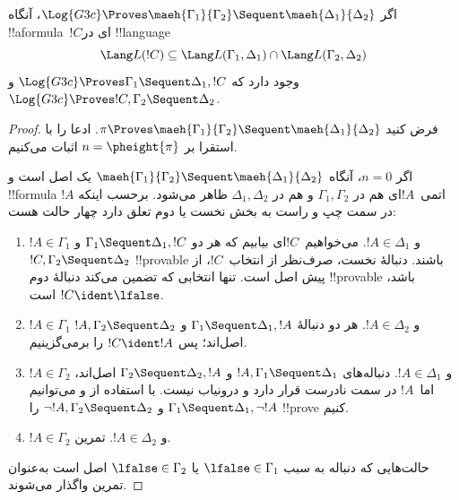 \documentclass[../../../include/open-logic-section]{subfiles}
\begin{document}
\begin{lem}[لم مائهارا]
اگر
$\Log{G3c}\Proves\maeh{\Gamma_1}{\Gamma_2}\Sequent
\maeh{\Delta_1}{\Delta_2}$، آنگاه !!a{formula}~$!C$ای در
!!{language}
\[
\Lang L(!C)\subseteq
\Lang L(\Gamma_1,\Delta_1)\cap\Lang L(\Gamma_2,\Delta_2)
\]
وجود دارد که
$\Log{G3c}\Proves\Gamma_1\Sequent\Delta_1,!C$ و
$\Log{G3c}\Proves !C,\Gamma_2\Sequent\Delta_2$.
\end{lem}

\begin{proof}
فرض کنید
$\pi\Proves\maeh{\Gamma_1}{\Gamma_2}\Sequent
\maeh{\Delta_1}{\Delta_2}$. ادعا را با استقرا بر
$n=\pheight{\pi}$ اثبات می‌کنیم.

اگر $n=0$، آنگاه
$\maeh{\Gamma_1}{\Gamma_2}\Sequent
\maeh{\Delta_1}{\Delta_2}$ یک اصل است و !!{formula} اتمی~$!A$ای هم
در $\Gamma_1,\Gamma_2$ و هم در $\Delta_1,\Delta_2$ ظاهر می‌شود. برحسب
اینکه $!A$ در سمت چپ و راست به بخش نخست یا دوم تعلق دارد چهار حالت
هست:
\begin{enumerate}
\item $!A\in\Gamma_1$ و $!A\in\Delta_1$. می‌خواهیم~$!C$ای بیابیم که
هر دو $\Gamma_1\Sequent\Delta_1,!C$ و
$!C,\Gamma_2\Sequent\Delta_2$ !!{provable} باشند. دنبالهٔ نخست،
صرف‌نظر از انتخاب~$!C$، از پیش اصل است. تنها انتخابی که تضمین می‌کند
دنبالهٔ دوم !!{provable} باشد، $!C\ident\lfalse$ است.
\item $!A\in\Gamma_1$ و $!A\in\Delta_2$. هر دو دنبالهٔ
$\Gamma_1\Sequent\Delta_1,!A$ و
$!A,\Gamma_2\Sequent\Delta_2$ اصل‌اند؛ پس $!C\ident !A$ را
برمی‌گزینیم.
\item $!A\in\Gamma_2$ و $!A\in\Delta_1$. دنباله‌های
$!A,\Gamma_1\Sequent\Delta_1$ و
$\Gamma_2\Sequent\Delta_2,!A$ اصل‌اند، اما~$!A$ در سمت نادرست قرار
دارد و درونیاب نیست. با استفاده از \RightR{\lnot} و
\LeftR{\lnot} می‌توانیم
$\Gamma_1\Sequent\Delta_1,\lnot !A$ و
$\lnot !A,\Gamma_2\Sequent\Delta_2$ را !!{prove} کنیم.
\item $!A\in\Gamma_2$ و $!A\in\Delta_2$. تمرین.
\end{enumerate}
حالت‌هایی که دنباله به سبب
$\lfalse\in\Gamma_1$ یا $\lfalse\in\Gamma_2$ اصل است به‌عنوان تمرین
واگذار می‌شوند.


\end{proof}
\end{document}

